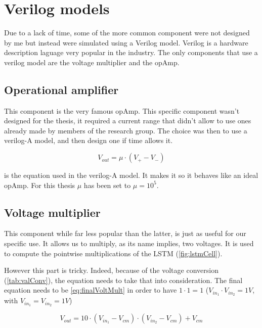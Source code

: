 \section{Verilog models}
\label{sec:models}

Due to a lack of time, some of the more common component were not designed by me but instead were simulated using a Verilog model. Verilog is a hardware description laguage very popular in the industry. The only components that use a verilog model are the voltage multiplier and the \ac{opAmp}.

\subsection{Operational amplifier}\label{subsec:opamp}

This component is the very famous \ac{opAmp}. This specific component wasn't designed for the thesis, it required a current range that didn't allow to use ones already made by members of the research group. The choice was then to use a verilog-A model, and then design one if time allows it.

\begin{equation}
  \label{eq:opAmp}
  V_{out}=\mu \cdot (V_+-V_-)
\end{equation}

 is the equation used in the verilog-A model. It makes it so it behaves like an ideal \ac{opAmp}. For this thesis $\mu$ has been set to $\mu=10^5$.

\subsection{Voltage multiplier}\label{subsec:voltmult}

This component while far less popular than the latter, is just as useful for our specific use. It allows us to multiply, as its name implies, two voltages. It is used to compute the pointwise multiplications of the \ac{LSTM} (\cref{fig:lstmCell}).

However this part is tricky. Indeed, because of the voltage conversion (\cref{tab:valConv}), the equation needs to take that into consideration. The final equation needs to be \cref{eq:finalVoltMult} in order to have $1\cdot 1=1$ ($V_{in_1}\cdot V_{in_2}=1V$, with $V_{in_1}=V_{in_2}=1V$)

\begin{equation}\label{eq:finalVoltMult}
  V_{out}=10\cdot(V_{in_1}-V_{cm})\cdot (V_{in_2}-V_{cm}) + V_{cm}
\end{equation}

